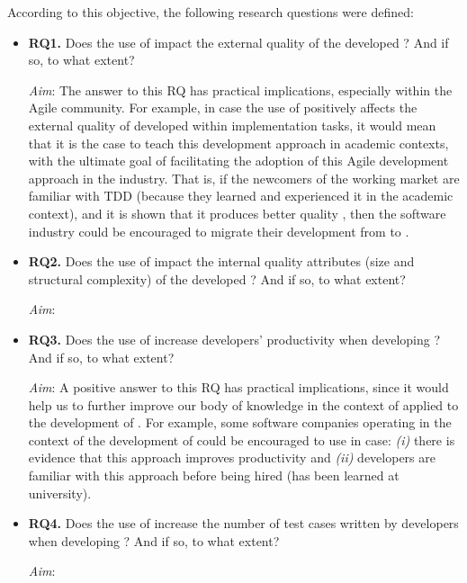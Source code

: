 \noindent According to this objective, the following research questions were defined:
\begin{itemize}
    \item \textbf{RQ1.} Does the use of \tdd impact the external quality of the developed \ess? And if so, to what extent?

    \noindent\textit{Aim}: The answer to this RQ has practical implications, especially within the Agile community. For example, in case the use of \tdd positively affects the external quality of \ess developed within implementation tasks, it would mean that it is the case to teach this development approach in academic contexts, with the ultimate goal of facilitating the adoption of this Agile development approach in the industry. That is, if the newcomers of the working market are familiar with TDD (because they learned and experienced it in the academic context), and it is shown that it produces better quality \ess, then the software industry could be encouraged to migrate their development from \notdd to \tdd.

    \item \textbf{RQ2.} Does the use of \tdd impact the internal quality attributes (\ie size and structural complexity) of the developed \ess? And if so, to what extent?

    \noindent\textit{Aim}: 

    \item \textbf{RQ3.} Does the use of \tdd increase developers' productivity when developing \ess? And if so, to what extent?

    \noindent\textit{Aim}: A positive answer to this RQ has practical implications, since it would help us to further improve our body of knowledge in the context of \tdd applied to the development of \ess. For example, some software companies operating in the context of the development of \ess could be encouraged to use \tdd in case: \textit{(i)} there is evidence that this approach
    improves productivity and \textit{(ii)} developers are familiar with this approach before being hired (\eg \tdd has been learned at university).

    \item \textbf{RQ4.} Does the use of \tdd increase the number of test cases written by developers when developing \ess? And if so, to what extent?

    \noindent\textit{Aim}: 
\end{itemize}




